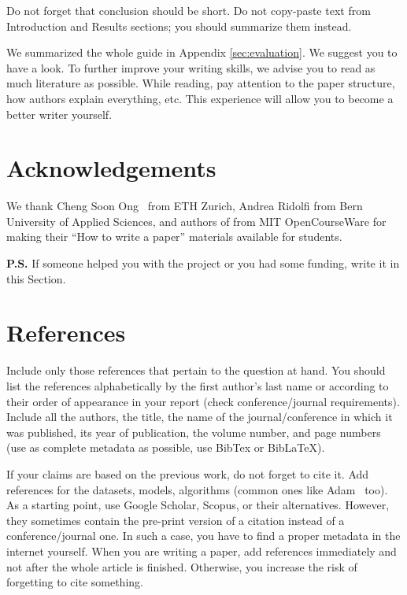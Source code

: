 \documentclass[10pt,conference,compsocconf]{IEEEtran}
\begin{document}
Do not forget that conclusion should be short. Do not copy-paste text from Introduction and Results sections; you should summarize them instead.

We summarized the whole guide in Appendix \ref{sec:evaluation}. We suggest you to have a look. To further improve your writing skills, we advise you to read as much literature as possible. While reading, pay attention to the paper structure, how authors explain everything, etc. This experience will allow you to become a better writer yourself.

\section{Acknowledgements}\label{sec:acknowledgements}
We thank Cheng Soon Ong~\cite{ethz} from ETH Zurich, Andrea Ridolfi from Bern University of Applied Sciences, and authors of \cite{mitGuidelinesWriting} from MIT OpenCourseWare for making their ``How to write a paper'' materials available for students.

\textbf{P.S.} If someone helped you with the project or you had some funding, write it in this Section.

\section*{References}
Include only those references that pertain to the question at hand. You should list the references alphabetically by the first author’s last name or according to their order of appearance in your report (check conference/journal requirements). Include all the authors, the title, the name of the journal/conference in which it was published, its year of publication, the volume number, and page numbers (use as complete metadata as possible, use BibTex or BibLaTeX).

If your claims are based on the previous work, do not forget to cite it. Add references for the datasets, models, algorithms (common ones like Adam~\cite{kingma2014adam} too). As a starting point, use Google Scholar, Scopus, or their alternatives. However, they sometimes contain the pre-print version of a citation instead of a conference/journal one. In such a case, you have to find a proper metadata in the internet yourself.  When you are writing a paper, add references immediately and not after the whole article is finished. Otherwise, you increase the risk of forgetting to cite something.



\end{document}
